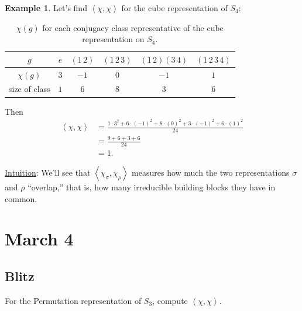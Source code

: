 \documentclass[12pt]{article}
\newcommand{\vbrack}[1]{\left \langle #1 \right \rangle}
\theoremstyle{definition}
\newtheorem{example}{Example}[section]
\begin{document}
\begin{example}
    Let's find $\vbrack{\chi , \chi}$ for the cube representation of $S_4$:
    \begin{table}[H]
        \centering
        \begin{tabular}{|| c || c | c | c | c | c ||}
            \hline
            $g$ & $e$ & $(1\,2)$ & $(1\,2\,3)$ & $(1\,2)(3\,4)$ & $(1\,2\,3\,4)$  \\
            \hline
            $\chi(g)$ & $3$ & $-1$ & $0$ & $-1$ & $1$ \\
            \hline
            size of class & $1$ & $6$ & $8$ & $3$ & $6$ \\
            \hline
        \end{tabular}
        \caption{$\chi(g)$ for each conjugacy class representative of the cube representation on $S_4$.}
        \label{tab:Table1}
    \end{table}
    Then 
    \begin{equation}
        \begin{split}
            \vbrack{\chi , \chi} & = \frac{1 \cdot 3^2 + 6 \cdot (-1)^2 + 8 \cdot (0)^2 + 3 \cdot (-1)^2 + 6 \cdot (1)^2}{24} \\
            & = \frac{9 + 6 + 3 + 6}{24} \\
            & = \boxed{1.}
        \end{split}
    \end{equation}
\end{example}
\noindent \underline{Intuition}: We'll see that $\vbrack{ \chi_{\sigma} , \chi_{\rho}}$ measures how much the two representations $\sigma$ and $\rho$ ``overlap,'' that is, how many irreducible building blocks they have in common.

\section{March 4}

\subsection{Blitz}
For the Permutation representation of $S_3$, compute $\vbrack{ \chi , \chi}$.
\end{document}
